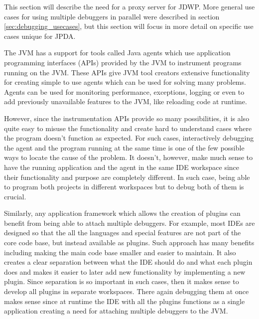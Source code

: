 \documentclass[..thesis.tex]{subfiles}
\begin{document}
This section will describe the need for a proxy server for JDWP.
More general use cases for using multiple debuggers in parallel were described in section \ref{sec:debugging_usecases}, but this section will focus in more detail on specific use cases unique for JPDA.

The JVM has a support for tools called Java agents which use application programming interfaces (APIs) provided by the JVM to instrument programs running on the JVM.
These APIs give JVM tool creators extensive functionality for creating simple to use agents which can be used for solving many problems.
Agents can be used for monitoring performance, exceptions, logging or even to add previously unavailable features to the JVM, like reloading code at runtime.

However, since the instrumentation APIs provide so many possibilities, it is also quite easy to misuse the functionality and create hard to understand cases where the program doesn't function as expected.
For such cases, interactively debugging the agent and the program running at the same time is one of the few possible ways to locate the cause of the problem.
It doesn't, however, make much sense to have the running application and the agent in the same IDE workspace since their functionality and purpose are completely different.
In such case, being able to program both projects in different workspaces but to debug both of them is crucial.

Similarly, any application framework which allows the creation of plugins can benefit from being able to attach multiple debuggers.
For example, most IDEs are designed so that the all the languages and special features are not part of the core code base, but instead available as plugins. 
Such approach has many benefits including making the main code base smaller and easier to maintain.
It also creates a clear separation between what the IDE should do and what each plugin does and makes it easier to later add new functionality by implementing a new plugin.
Since separation is so important in such cases, then it makes sense to develop all plugins in separate workspaces.
There again debugging them at once makes sense since at runtime the IDE with all the plugins functions as a single application creating a need for attaching multiple debuggers to the JVM.
\end{document}
